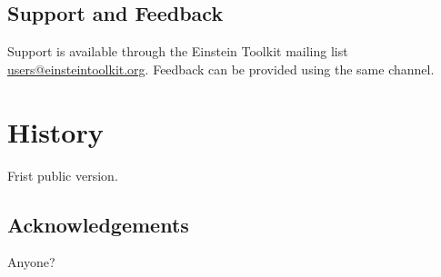 \subsection{Support and Feedback}
Support is available through the Einstein Toolkit mailing list
\url{users@einsteintoolkit.org}. Feedback can be provided using the same
channel.

\section{History}
Frist public version.

\subsection{Acknowledgements}
Anyone?

%



